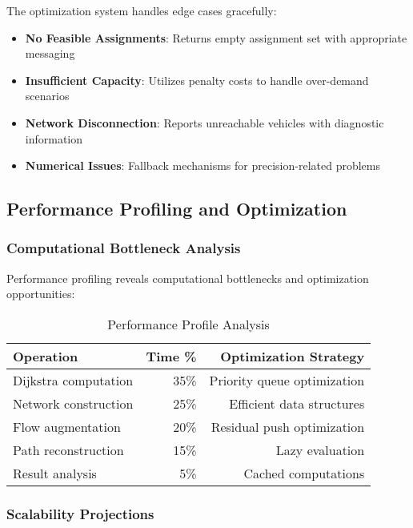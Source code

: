 \documentclass[12pt,a4paper]{article}
\begin{document}
The optimization system handles edge cases gracefully:

\begin{itemize}
\item \textbf{No Feasible Assignments}: Returns empty assignment set with appropriate messaging
\item \textbf{Insufficient Capacity}: Utilizes penalty costs to handle over-demand scenarios
\item \textbf{Network Disconnection}: Reports unreachable vehicles with diagnostic information
\item \textbf{Numerical Issues}: Fallback mechanisms for precision-related problems
\end{itemize}

\subsection{Performance Profiling and Optimization}

\subsubsection{Computational Bottleneck Analysis}

Performance profiling reveals computational bottlenecks and optimization opportunities:

\begin{table}[H]
\centering
\caption{Performance Profile Analysis}
\label{tab:performance_profile}
\begin{tabular}{@{}lrr@{}}
\toprule
\textbf{Operation} & \textbf{Time \%} & \textbf{Optimization Strategy} \\
\midrule
Dijkstra computation & 35\% & Priority queue optimization \\
Network construction & 25\% & Efficient data structures \\
Flow augmentation & 20\% & Residual push optimization \\
Path reconstruction & 15\% & Lazy evaluation \\
Result analysis & 5\% & Cached computations \\
\bottomrule
\end{tabular}
\end{table}

\subsubsection{Scalability Projections}
\end{document}
